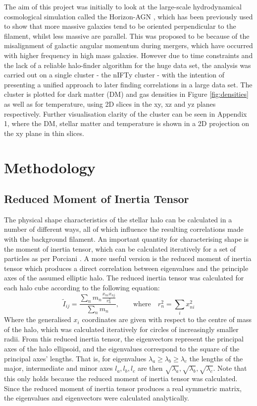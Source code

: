 \documentclass[journal]{IEEEtran}
\begin{document}
The aim of this project was initially to look at the large-scale hydrodynamical cosmological simulation called the Horizon-AGN \cite{dubois14}, which has been previously used to show that more massive galaxies tend to be oriented perpendicular to the filament, whilst less massive are parallel. This was proposed to be because of the misalignment of galactic angular momentum during mergers, which have occurred with higher frequency in high mass galaxies. However due to time constraints and the lack of a reliable halo-finder algorithm for the huge data set, the analysis was carried out on a single cluster - the nIFTy cluster \cite{nifty}- with the intention of presenting a unified approach to later finding correlations in a large data set. The cluster is plotted for dark matter (DM) and gas densities in Figure \ref{fig:densities} as well as for temperature, using 2D slices in the xy, xz and yz planes respectively. Further visualisation clarity of the cluster can be seen in Appendix 1, where the DM, stellar matter and temperature is shown in a 2D projection on the xy plane in thin slices. 

\section{Methodology}
\subsection{Reduced Moment of Inertia Tensor}
The physical shape characteristics of the stellar halo can be calculated in a number of different ways, all of which influence the resulting correlations made with the background filament. An important quantity for characterising shape is the moment of inertia tensor, which can be calculated iteratively for a set of particles as per Porciani \cite{porciani02a}. A more useful version is the reduced moment of inertia tensor \cite{tenneti15} which produces a direct correlation between eigenvalues and the principle axes of the assumed elliptic halo. The reduced inertia tensor was calculated for each halo cube according to the following equation:
\begin{equation}
	\tilde{I}_{ij}=\frac{\sum_n m_n \frac{x_{ni}x_{nj}}{r^2_n}}{\sum_n m_n}, \quad \quad \text{where} \quad r^2_n=\sum_i x^2_{ni}
	\label{eq:moitensor}
\end{equation}
Where the generalised $x_i$ coordinates are given with respect to the centre of mass of the halo, which was calculated iteratively for circles of increasingly smaller radii. From this reduced inertia tensor, the eigenvectors represent the principal axes of the halo ellipsoid, and the eigenvalues correspond to the square of the principal axes' lengths. That is, for eigenvalues $\lambda_{a} \geq \lambda_{b} \geq \lambda_{c} $ the lengths of the major, intermediate and minor axes $l_{a},l_{b},l_{c}$ are then $\sqrt{\lambda_{a}}, \sqrt{\lambda_{b}}, \sqrt{\lambda_{c}}$. Note that this only holds because the reduced moment of inertia tensor was calculated.
Since the reduced moment of inertia tensor produces a real symmetric matrix, the eigenvalues and eigenvectors were calculated analytically. 
\end{document}

